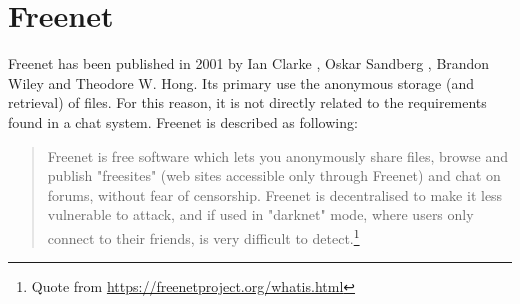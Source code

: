 \section{Freenet}
Freenet has been published in 2001 by
Ian Clarke , Oskar Sandberg , Brandon Wiley and Theodore W. Hong.\cite{freenet}
Its primary use the anonymous storage (and retrieval) of files. For this
reason, it is not directly related to the requirements found in a chat system.
Freenet is described as following:
\begin{quote}
Freenet is free software which lets you anonymously share files, browse and publish "freesites" (web sites accessible only through Freenet) and chat on forums, without fear of censorship. Freenet is decentralised to make it less vulnerable to attack, and if used in "darknet" mode, where users only connect to their friends, is very difficult to detect.\footnote{Quote from \url{https://freenetproject.org/whatis.html}}
\end{quote}
